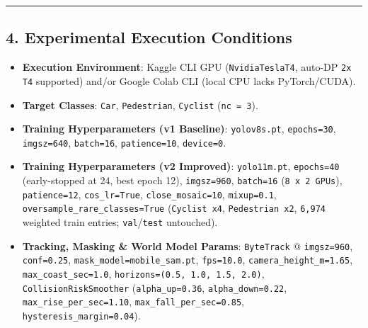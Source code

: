\documentclass[10.5pt,a4paper]{article}
\begin{document}
\par\noindent\rule{\textwidth}{0.4pt}\par\medskip

\subsection{4. Experimental Execution Conditions}

\begin{itemize}[leftmargin=1.5em,itemsep=2pt]
\item \textbf{Execution Environment}: Kaggle CLI GPU (\texttt{NvidiaTeslaT4}, auto-DP \texttt{2x T4} supported) and/or Google Colab CLI (local CPU lacks PyTorch/CUDA).
\item \textbf{Target Classes}: \texttt{Car}, \texttt{Pedestrian}, \texttt{Cyclist} (\texttt{nc = 3}).
\item \textbf{Training Hyperparameters (v1 Baseline)}: \texttt{yolov8s.\allowbreak{}pt}, \texttt{epochs=30}, \texttt{imgsz=640}, \texttt{batch=16}, \texttt{patience=10}, \texttt{device=0}.
\item \textbf{Training Hyperparameters (v2 Improved)}: \texttt{yolo11m.\allowbreak{}pt}, \texttt{epochs=40} (early-stopped at 24, best epoch 12), \texttt{imgsz=960}, \texttt{batch=16} (\texttt{8 x 2 GPUs}), \texttt{patience=12}, \texttt{cos\_\allowbreak{}lr=True}, \texttt{close\_\allowbreak{}mosaic=10}, \texttt{mixup=0.\allowbreak{}1}, \texttt{oversample\_\allowbreak{}rare\_\allowbreak{}classes=True} (\texttt{Cyclist x4}, \texttt{Pedestrian x2}, \texttt{6,\allowbreak{}974} weighted train entries; \texttt{val}/\texttt{test} untouched).
\item \textbf{Tracking, Masking \& World Model Params}: \texttt{ByteTrack} @ \texttt{imgsz=960}, \texttt{conf=0.\allowbreak{}25}, \texttt{mask\_\allowbreak{}model=mobile\_\allowbreak{}sam.\allowbreak{}pt}, \texttt{fps=10.\allowbreak{}0}, \texttt{camera\_\allowbreak{}height\_\allowbreak{}m=1.\allowbreak{}65}, \texttt{max\_\allowbreak{}coast\_\allowbreak{}sec=1.\allowbreak{}0}, \texttt{horizons=(0.\allowbreak{}5,\allowbreak{} 1.\allowbreak{}0,\allowbreak{} 1.\allowbreak{}5,\allowbreak{} 2.\allowbreak{}0)}, \texttt{CollisionRiskSmoother} (\texttt{alpha\_\allowbreak{}up=0.\allowbreak{}36}, \texttt{alpha\_\allowbreak{}down=0.\allowbreak{}22}, \texttt{max\_\allowbreak{}rise\_\allowbreak{}per\_\allowbreak{}sec=1.\allowbreak{}10}, \texttt{max\_\allowbreak{}fall\_\allowbreak{}per\_\allowbreak{}sec=0.\allowbreak{}85}, \texttt{hysteresis\_\allowbreak{}margin=0.\allowbreak{}04}).
\end{itemize}
\end{document}

